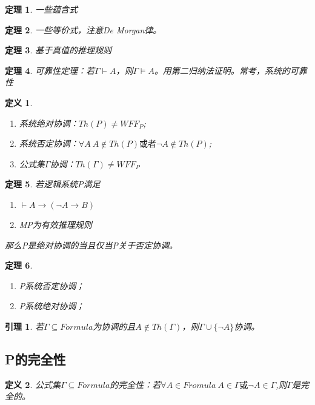 \documentclass[a4paper]{ctexart}
\newtheorem{thm}{\hspace{2em}定理}[subsection]
\newtheorem{lem}{\hspace{2em}引理}
\newtheorem{defi}{\hspace{2em}定义}[subsection]
\newcommand{\shade}[1]{\colorbox{shadecolor}{#1}}
\begin{document}
\begin{thm}
  一些蕴含式
\end{thm}
\begin{thm}
  一些等价式，注意De Morgan律。
\end{thm}
\begin{thm}
  基于真值的推理规则
\end{thm}
\begin{thm}
  可靠性定理：若$\Gamma\vdash A$，则$\Gamma\models A$。用第二归纳法证明。\shade{常考，系统的可靠性}
\end{thm}

\begin{defi}
  \begin{enumerate}[itemindent=2em]
    \item 系统绝对协调：$Th(P)\neq WFF_P$;\newline
    \item 系统否定协调：$\forall{A}\ A\not\in Th(P)\text{或者}\neg A\not\in Th(P)$;\newline
    \item 公式集$\Gamma$协调：$Th(\Gamma)\neq WFF_P$
  \end{enumerate}
\end{defi}

\begin{thm}
  若逻辑系统P满足
  \begin{enumerate}[itemindent=2em]
    \item $\vdash A\rightarrow(\neg A\rightarrow B)$
    \item MP为有效推理规则
  \end{enumerate}
  那么P是绝对协调的当且仅当P关于否定协调。
\end{thm}

\begin{thm}
  \begin{enumerate}[itemindent=2em]
    \item P系统否定协调；
    \item P系统绝对协调；
  \end{enumerate}
\end{thm}

\begin{lem}
  若$\Gamma\subseteq Formula$为协调的且$A\not\in Th(\Gamma)$，则$\Gamma\cup\{\neg A\}$协调。
\end{lem}

\subsection{P的完全性}
\begin{defi}
  公式集$\Gamma\subseteq Formula$的完全性：若$\forall{A\in Fromula}\  A\in\Gamma\text{或}\neg A\in\Gamma$,则$\Gamma$是完全的。
\end{defi}
\end{document}
